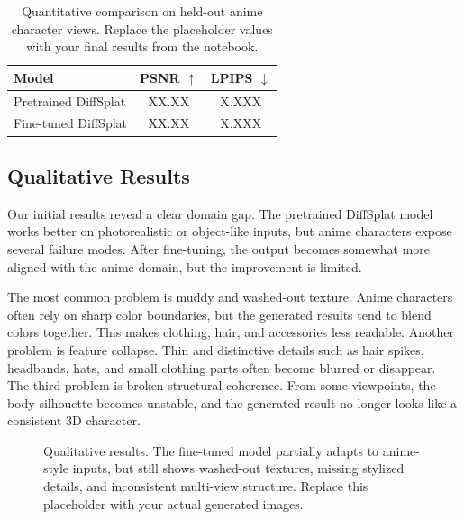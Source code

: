 \documentclass[10pt,twocolumn,letterpaper]{article}
\begin{document}
\begin{table}[t]
\centering
\begin{tabular}{lcc}
\hline
Model & PSNR $\uparrow$ & LPIPS $\downarrow$ \\
\hline
Pretrained DiffSplat & XX.XX & X.XXX \\
Fine-tuned DiffSplat & XX.XX & X.XXX \\
\hline
\end{tabular}
\caption{Quantitative comparison on held-out anime character views. Replace the placeholder values with your final results from the notebook.}
\label{tab:quant}
\end{table}

\subsection{Qualitative Results}

Our initial results reveal a clear domain gap. The pretrained DiffSplat model works better on photorealistic or object-like inputs, but anime characters expose several failure modes. After fine-tuning, the output becomes somewhat more aligned with the anime domain, but the improvement is limited.

The most common problem is muddy and washed-out texture. Anime characters often rely on sharp color boundaries, but the generated results tend to blend colors together. This makes clothing, hair, and accessories less readable. Another problem is feature collapse. Thin and distinctive details such as hair spikes, headbands, hats, and small clothing parts often become blurred or disappear. The third problem is broken structural coherence. From some viewpoints, the body silhouette becomes unstable, and the generated result no longer looks like a consistent 3D character.

\begin{figure}[t]
    \centering
    \caption{Qualitative results. The fine-tuned model partially adapts to anime-style inputs, but still shows washed-out textures, missing stylized details, and inconsistent multi-view structure. Replace this placeholder with your actual generated images.}
    \label{fig:qual}
\end{figure}
\end{document}
